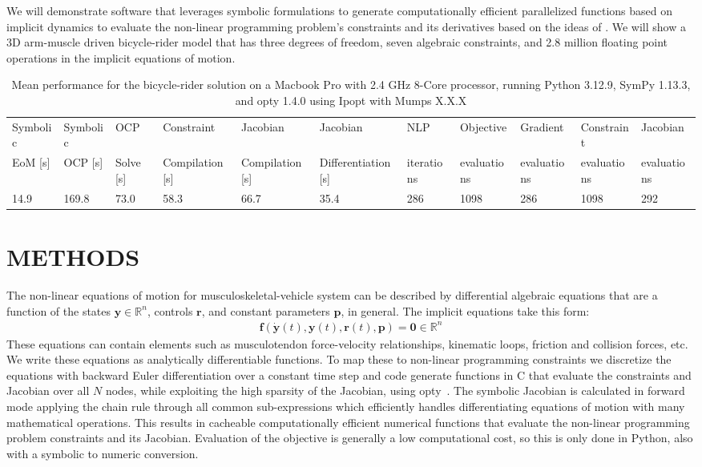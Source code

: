 \documentclass[11pt,twocolumn]{article}
\begin{document}
We will demonstrate software that leverages symbolic formulations to generate
computationally efficient parallelized functions based on implicit dynamics to
evaluate the non-linear programming problem's constraints and its derivatives
based on the ideas of \cite{vandenBogert2011a}. We will show a 3D arm-muscle
driven bicycle-rider model that has three degrees of freedom, seven algebraic
constraints, and 2.8 million floating point operations in the implicit equations
of motion.
%
\begin{table}[t]
  \centering
  \caption{Mean performance for the bicycle-rider solution on a Macbook Pro with
  2.4 GHz 8-Core processor, running Python 3.12.9, SymPy 1.13.3, and opty 1.4.0
  using Ipopt with Mumps X.X.X}
  \scriptsize
  \begin{tabular}{lllllllllll}
    Symbolic & Symbolic & OCP & Constraint & Jacobian  & Jacobian & NLP & Objective &  Gradient & Constraint & Jacobian \\
    EoM [s] & OCP [s] & Solve [s] & Compilation [s] & Compilation [s] &
    Differentiation [s] & iterations & evaluations & evaluations & evaluations &
    evaluations \\
    14.9 & 169.8 & 73.0 & 58.3 & 66.7 & 35.4 & 286 & 1098 & 286 & 1098 & 292
  \end{tabular}
  \label{tab:performance}
\end{table}

\section*{METHODS}
%
The non-linear equations of motion for musculoskeletal-vehicle system can be
described by differential algebraic equations that are a function of the states
\(\mathbf{y} \in \mathbb{R}^n\), controls \(\mathbf{r}\), and constant
parameters \(\mathbf{p}\), in general. The implicit equations take this form:
%
\begin{align}
  \mathbf{f}(\dot{\mathbf{y}}(t), \mathbf{y}(t), \mathbf{r}(t), \mathbf{p}) =
  \mathbf{0} \in \mathbb{R}^n
\end{align}
%
These equations can contain elements such as musculotendon force-velocity
relationships, kinematic loops, friction and collision forces, etc. We write
these equations as analytically differentiable functions. To map these to
non-linear programming constraints we discretize the equations with backward
Euler differentiation over a constant time step and code generate functions in C
that evaluate the constraints and Jacobian over all \(N\) nodes, while
exploiting the high sparsity of the Jacobian, using opty~\cite{Moore2018}. The
symbolic Jacobian is calculated in forward mode applying the chain rule through
all common sub-expressions which efficiently handles differentiating equations
of motion with many mathematical operations. This results in cacheable
computationally efficient numerical functions that evaluate the non-linear
programming problem constraints and its Jacobian. Evaluation of the objective is
generally a low computational cost, so this is only done in Python, also with a
symbolic to numeric conversion.
\end{document}
